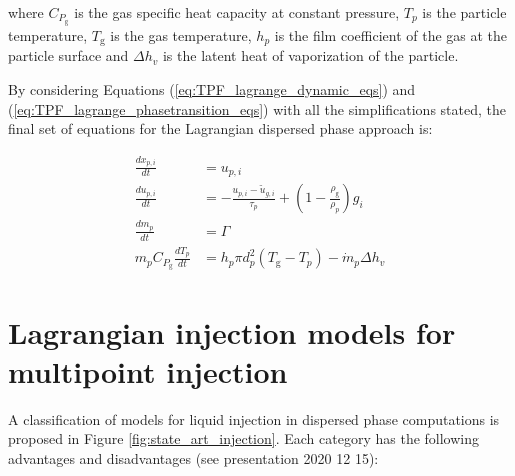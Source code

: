 where $C_{P_\mathrm{g}}$ is the gas specific heat capacity at constant pressure, $T_p$ is the particle temperature, $T_\mathrm{g}$ is the gas temperature, $h_p$ is the film coefficient of the gas at the particle surface and $\Delta h_v$ is the latent heat of vaporization of the particle. 

By considering Equations (\ref{eq:TPF_lagrange_dynamic_eqs}) and (\ref{eq:TPF_lagrange_phasetransition_eqs}) with all the simplifications stated, the final set of equations for the Lagrangian dispersed phase approach is:

\begin{subequations}
\begin{align}
\frac{d x_{p,i}}{d t} &= u_{p,i} \\
\frac{d u_{p,i}}{d t} &= - \frac{u_{p,i} - \widetilde{u}_{g,i} }{\tau_p} + \left( 1 - \frac{\rho_\mathrm{g}}{\rho_p} \right) g_i \\
\frac{d m_p}{d t} &= \Gamma \\
m_p C_{P_\mathrm{g}} \frac{d T_p}{d t} &= h_p \pi d_p^2 \left( T_\mathrm{g} - T_p \right) - \dot{m}_p  \Delta h_v
\end{align}
\end{subequations}



\section{Lagrangian injection models for multipoint injection}
\label{sec:ch3_state_art_lagrangian_injection}

A classification of models for liquid injection in dispersed phase computations is proposed in Figure \ref{fig:state_art_injection}. Each category has the following advantages and disadvantages (see presentation 2020 12 15):

